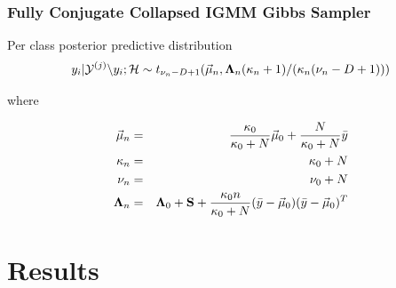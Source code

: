 \documentclass{beamer}
\begin{document}
\begin{frame}
\frametitle{Fully Conjugate Collapsed IGMM Gibbs Sampler}
\begin{block}{Per class posterior predictive distribution}
\begin{equation} y_i | \mathcal{Y}^{(j)} \backslash y_i; \mathcal{H} \sim t_{\nu_n-D+1}(\vec \mu_n, {\bf \Lambda}_n(\kappa_n +1) / (\kappa_n(\nu_n-D+1)))
\label{existing_table_posterior_predictive}
\end{equation}

\noindent where 

\begin{eqnarray*}
\vec \mu_n &=& \frac{\kappa_0}{\kappa_0+N}\vec \mu_0 + \frac{N}{\kappa_0+N}\bar y \\
\kappa_n &=& \kappa_0+N \\
\nu_n &=& \nu_0 + N \\
{\bf \Lambda}_n &=& {\bf \Lambda}_0 + {\bf S} + \frac{\kappa_0n}{\kappa_0+N}(\bar y - \vec \mu_0)(\bar y - \vec \mu_0)^T
\end{eqnarray*}
\end{block}
\end{frame}

\section{Results}
\end{document}
